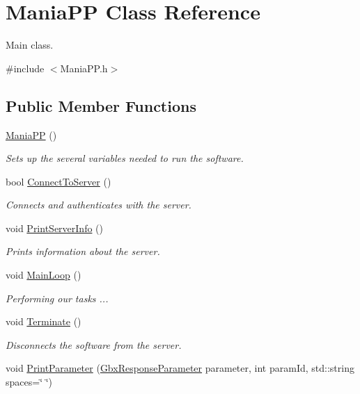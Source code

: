 \hypertarget{classManiaPP}{\section{Mania\-P\-P Class Reference}
\label{classManiaPP}
}


Main class.  




{\ttfamily \#include $<$Mania\-P\-P.\-h$>$}

\subsection*{Public Member Functions}
\begin{DoxyCompactItemize}
\item 
\hyperlink{classManiaPP_ae56f6623dc89f2c0b75bec631cfc2d19}{Mania\-P\-P} ()
\begin{DoxyCompactList}\small\item\em Sets up the several variables needed to run the software. \end{DoxyCompactList}\item 
bool \hyperlink{classManiaPP_a22561171876e54dbf633c70d9924c06a}{Connect\-To\-Server} ()
\begin{DoxyCompactList}\small\item\em Connects and authenticates with the server. \end{DoxyCompactList}\item 
void \hyperlink{classManiaPP_a56d2774a29f21b3a164ae1f7ea6bd88b}{Print\-Server\-Info} ()
\begin{DoxyCompactList}\small\item\em Prints information about the server. \end{DoxyCompactList}\item 
void \hyperlink{classManiaPP_a8dff9e8e3835c3cac0df105a7bcce43c}{Main\-Loop} ()
\begin{DoxyCompactList}\small\item\em Performing our tasks ... \end{DoxyCompactList}\item 
void \hyperlink{classManiaPP_a87fd53fffe4a1840834a90ab575f5ce6}{Terminate} ()
\begin{DoxyCompactList}\small\item\em Disconnects the software from the server. \end{DoxyCompactList}\item 
void \hyperlink{classManiaPP_a3548cbafbf949dbb9d210c08adb5f7de}{Print\-Parameter} (\hyperlink{classGbxResponseParameter}{Gbx\-Response\-Parameter} parameter, int param\-Id, std\-::string spaces=\char`\"{}    \char`\"{})
\end{DoxyCompactItemize}
